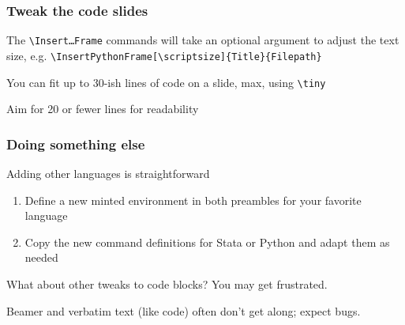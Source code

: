 \documentclass[aspectratio=169,handout]{beamer}
\begin{document}
\begin{frame}
	\frametitle{Tweak the code slides}
	\begin{witem}
		\item The \texttt{\textbackslash{}Insert\dots{}Frame} commands will take an optional 
			argument to adjust the text size, e.g.
			\texttt{\textbackslash{}InsertPythonFrame[\textbackslash{}scriptsize]\{Title\}\{Filepath\}}
		\item You can fit up to 30-ish lines of code on a slide, max, using \texttt{\textbackslash{}tiny} 
		\item Aim for 20 or fewer lines for readability
	\end{witem}
\end{frame}

\begin{frame}
	\frametitle{Doing something else}
	\begin{witem}
		\item Adding other languages is straightforward
			\begin{enumerate}
				\item Define a new minted environment
					in both preambles for your favorite language
					\href{https://pygments.org/languages/}{}
				\item Copy the new command definitions for Stata or Python and adapt them as needed
			\end{enumerate}
		\item What about other tweaks to code blocks? You may get frustrated.
		\item Beamer and verbatim text (like code) often don't get along; expect bugs.
	\end{witem}
\end{frame}




\end{document}
